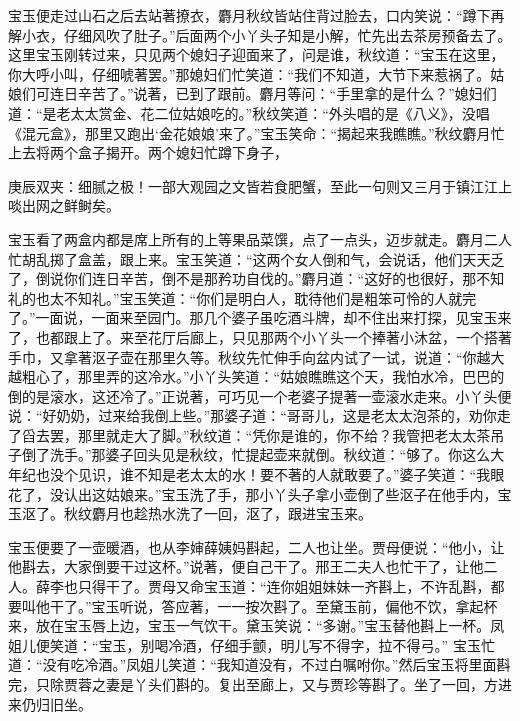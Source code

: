 \begin{parag}
    宝玉便走过山石之后去站著撩衣，麝月秋纹皆站住背过脸去，口内笑说：“蹲下再解小衣，仔细风吹了肚子。”后面两个小丫头子知是小解，忙先出去茶房预备去了。这里宝玉刚转过来，只见两个媳妇子迎面来了，问是谁，秋纹道：“宝玉在这里，你大呼小叫，仔细唬著罢。”那媳妇们忙笑道：“我们不知道，大节下来惹祸了。姑娘们可连日辛苦了。”说著，已到了跟前。麝月等问：“手里拿的是什么？”媳妇们道：“是老太太赏金、花二位姑娘吃的。”秋纹笑道：“外头唱的是《八义》，没唱《混元盒》，那里又跑出‘金花娘娘’来了。”宝玉笑命：“揭起来我瞧瞧。”秋纹麝月忙上去将两个盒子揭开。两个媳妇忙蹲下身子，\begin{note}庚辰双夹：细腻之极！一部大观园之文皆若食肥蟹，至此一句则又三月于镇江江上啖出网之鲜鲥矣。\end{note}宝玉看了两盒内都是席上所有的上等果品菜馔，点了一点头，迈步就走。麝月二人忙胡乱掷了盒盖，跟上来。宝玉笑道：“这两个女人倒和气，会说话，他们天天乏了，倒说你们连日辛苦，倒不是那矜功自伐的。”麝月道：“这好的也很好，那不知礼的也太不知礼。”宝玉笑道：“你们是明白人，耽待他们是粗笨可怜的人就完了。”一面说，一面来至园门。那几个婆子虽吃酒斗牌，却不住出来打探，见宝玉来了，也都跟上了。来至花厅后廊上，只见那两个小丫头一个捧著小沐盆，一个搭著手巾，又拿著沤子壶在那里久等。秋纹先忙伸手向盆内试了一试，说道：“你越大越粗心了，那里弄的这冷水。”小丫头笑道：“姑娘瞧瞧这个天，我怕水冷，巴巴的倒的是滚水，这还冷了。”正说著，可巧见一个老婆子提著一壶滚水走来。小丫头便说：“好奶奶，过来给我倒上些。”那婆子道：“哥哥儿，这是老太太泡茶的，劝你走了舀去罢，那里就走大了脚。”秋纹道：“凭你是谁的，你不给？我管把老太太茶吊子倒了洗手。”那婆子回头见是秋纹，忙提起壶来就倒。秋纹道：“够了。你这么大年纪也没个见识，谁不知是老太太的水！要不著的人就敢要了。”婆子笑道：“我眼花了，没认出这姑娘来。”宝玉洗了手，那小丫头子拿小壶倒了些沤子在他手内，宝玉沤了。秋纹麝月也趁热水洗了一回，沤了，跟进宝玉来。
\end{parag}


\begin{parag}
    宝玉便要了一壶暖酒，也从李婶薛姨妈斟起，二人也让坐。贾母便说：“他小，让他斟去，大家倒要干过这杯。”说著，便自己干了。邢王二夫人也忙干了，让他二人。薛李也只得干了。贾母又命宝玉道：“连你姐姐妹妹一齐斟上，不许乱斟，都要叫他干了。”宝玉听说，答应著，一一按次斟了。至黛玉前，偏他不饮，拿起杯来，放在宝玉唇上边，宝玉一气饮干。黛玉笑说：“多谢。”宝玉替他斟上一杯。凤姐儿便笑道：“宝玉，别喝冷酒，仔细手颤，明儿写不得字，拉不得弓。” 宝玉忙道：“没有吃冷酒。”凤姐儿笑道：“我知道没有，不过白嘱咐你。”然后宝玉将里面斟完，只除贾蓉之妻是丫头们斟的。复出至廊上，又与贾珍等斟了。坐了一回，方进来仍归旧坐。
\end{parag}


